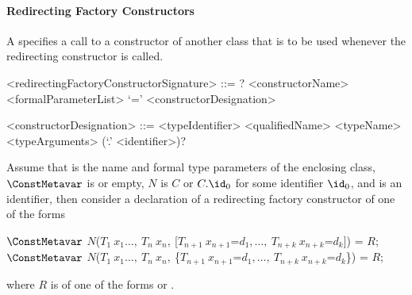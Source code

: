 \documentclass[makeidx]{article}
\begin{document}


\paragraph{Redirecting Factory Constructors}

\LMHash{}%
A 
specifies a call to a constructor of another class that is to be used
whenever the redirecting constructor is called.

\begin{grammar}
<redirectingFactoryConstructorSignature> ::= \gnewline{}
  \CONST? \FACTORY{} <constructorName> <formalParameterList> `=' \gnewline{}
  <constructorDesignation>

<constructorDesignation> ::= <typeIdentifier>
  \alt <qualifiedName>
  \alt <typeName> <typeArguments> (`.' <identifier>)?
\end{grammar}

Assume that
%
is the name and formal type parameters of the enclosing class,
%
$\ConstMetavar$ is \CONST{} or empty,
$N$ is $C$ or $C.\id_0$ for some identifier $\id_0$,
and \DefineSymbol{\id} is an identifier,
then consider a declaration of a redirecting factory constructor
 of one of the forms

\begin{normativeDartCode}
$\ConstMetavar$ \FACTORY{}
    $N$($T_1\ x_1 \ldots,\ T_n\ x_n,\ $[$T_{n+1}\ x_{n+1}$=$d_1, \ldots,\ T_{n+k}\ x_{n+k}$=$d_k$]) = $R$;
\\
$\ConstMetavar$ \FACTORY{}
    $N$($T_1\ x_1 \ldots,\ T_n\ x_n,\ $\{$T_{n+1}\ x_{n+1}$=$d_1, \ldots,\ T_{n+k}\ x_{n+k}$=$d_k$\}) = $R$;
\end{normativeDartCode}

\noindent
{}%
where $R$ is of one of the forms
 or
.

\end{document}
